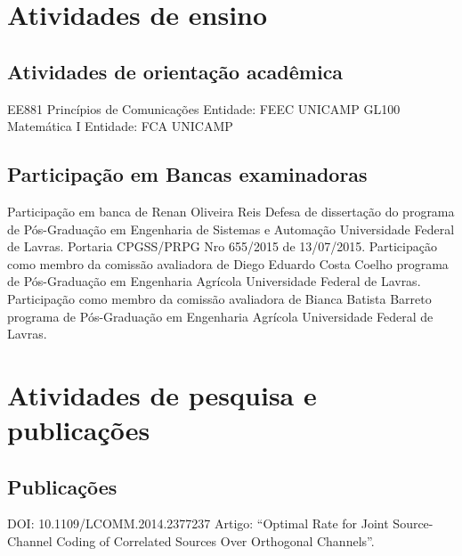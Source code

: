 \documentclass[11pt,a4paper,sans]{moderncv} %
\begin{document}

\section{Atividades de ensino}

\subsection{Atividades de orientação acadêmica}


			  {EE881 }{Princípios de Comunicações}{}
			  {Entidade: FEEC UNICAMP }
			  {GL100 }{Matemática I}{}
			  {Entidade: FCA UNICAMP }
			  
\subsection{Participação em Bancas examinadoras}
			{Participação em banca de Renan Oliveira Reis}
			{Defesa de dissertação do programa de Pós-Graduação em Engenharia de Sistemas e Automação}{}
			{Universidade Federal de Lavras. Portaria CPGSS/PRPG Nro 655/2015 de 13/07/2015.}
			{Participação como membro da comissão avaliadora de Diego Eduardo Costa Coelho}
			{programa de Pós-Graduação em Engenharia Agrícola}{}
			{Universidade Federal de Lavras.}
			{Participação como membro da comissão avaliadora de Bianca Batista Barreto}
			{programa de Pós-Graduação em Engenharia Agrícola}{}
			{Universidade Federal de Lavras.}			

\section{Atividades de pesquisa e publicações}
\subsection{Publicações}%
	      {DOI: 10.1109/LCOMM.2014.2377237}{}{}
	      {Artigo: ``Optimal  Rate for Joint Source-Channel Coding of Correlated Sources Over Orthogonal Channels''.}
\end{document}
